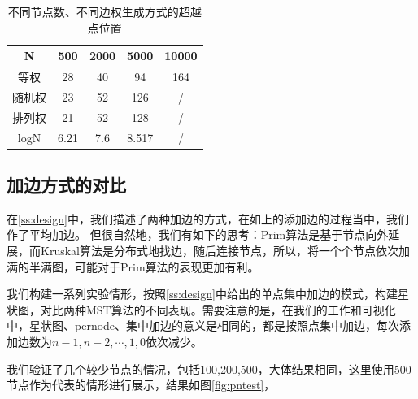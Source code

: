 \documentclass[UTF8]{ctexart}
\begin{document}
\begin{table}[htbp]
    \centering
    \begin{tabular}{|c|c|c|c|c|}
    \hline
    N    & 500  & 2000 & 5000  & 10000 \\ \hline
    等权   & 28   & 40   & 94    & 164   \\ \hline
    随机权  & 23   & 52   & 126   & /     \\ \hline
    排列权  & 21   & 52   & 128   & /     \\ \hline
    logN & 6.21 & 7.6  & 8.517 & /     \\ \hline
    \end{tabular}
    \caption{不同节点数、不同边权生成方式的超越点位置}
    \label{tab:suppoint}
\end{table}

\subsection{加边方式的对比}
在\ref{ss:design}中，我们描述了两种加边的方式，在如上的添加边的过程当中，我们作了平均加边。 但很自然地，我们有如下的思考：Prim算法是基于节点向外延展，而Kruskal算法是分布式地找边，随后连接节点，所以，将一个个节点依次加满的半满图，可能对于Prim算法的表现更加有利。

我们构建一系列实验情形，按照\ref{ss:design}中给出的单点集中加边的模式，构建星状图，对比两种MST算法的不同表现。需要注意的是，在我们的工作和可视化中，星状图、pernode、集中加边的意义是相同的，都是按照点集中加边，每次添加边数为\(n-1,n-2,\cdots,1,0\)依次减少。

我们验证了几个较少节点的情况，包括100,200,500，大体结果相同，这里使用500节点作为代表的情形进行展示，结果如图\ref{fig:pntest}， 
\end{document}
